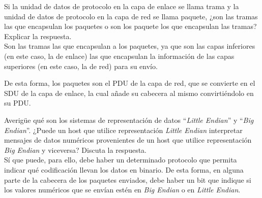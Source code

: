 \begin{ejercicio}
   Si la unidad de datos de protocolo en la capa de enlace se llama trama y la unidad de datos de protocolo en la capa de red se llama paquete, ¿son las tramas las que encapsulan los paquetes o son los paquete los que encapsulan las tramas? Explicar la respuesta. \\
   
   Son las tramas las que encapsulan a los paquetes, ya que son las capas inferiores (en este caso, la de enlace) las que encapsulan la información de las capas superiores (en este caso, la de red) para su envío.

   De esta forma, los paquetes son el \acrshort{PDU} de la capa de red, que se convierte en el \acrshort{SDU} de la capa de enlace, la cual añade su cabecera al mismo convirtiéndolo en su \acrshort{PDU}.
\end{ejercicio}

\begin{ejercicio}
    Averigüe qué son los sistemas de representación de datos ``\textit{Little Endian}'' y ``\textit{Big Endian}''. ¿Puede un host que utilice representación \textit{Little Endian} interpretar mensajes de datos numéricos provenientes de un host que utilice representación \textit{Big Endian} y viceversa? Discuta la respuesta.\\

    Sí que puede, para ello, debe haber un determinado protocolo que permita indicar qué codificación llevan los datos en binario. De esta forma, en alguna parte de la cabecera de los paquetes enviados, debe haber un bit que indique si los valores numéricos que se envían estén en \textit{Big Endian} o en \textit{Little Endian}.
\end{ejercicio}

